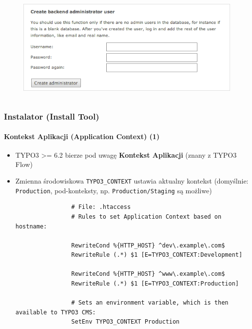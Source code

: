 \begin{frame}[fragile]
\begin{columns}[T]
\begin{column}{.7\textwidth}
			\begin{figure}\vspace*{-0.4cm}
				\includegraphics[width=0.9\linewidth]{Images/InstallTool/SaltedPasswords.png}
			\end{figure}
		\end{column}
	\end{columns}

\end{frame}


\begin{frame}[fragile]
	\frametitle{Instalator (Install Tool)}
	\framesubtitle{Kontekst Aplikacji (Application Context) (1)}

	\begin{itemize}
		\item TYPO3 >= 6.2 bierze pod uwagę \textbf{Kontekst Aplikacji}\newline
			\smaller(znany z TYPO3 Flow)\normalsize
		\item Zmienna środowiskowa \texttt{TYPO3\_CONTEXT} ustawia aktualny kontekst\newline
			\smaller(domyślnie: \texttt{Production}, pod-konteksty, np. \texttt{Production/Staging} są możliwe)\normalsize

			\begin{lstlisting}
				# File: .htaccess
				# Rules to set Application Context based on hostname:

				RewriteCond %{HTTP_HOST} ^dev\.example\.com$
				RewriteRule (.*) $1 [E=TYPO3_CONTEXT:Development]

				RewriteCond %{HTTP_HOST} ^www\.example\.com$
				RewriteRule (.*) $1 [E=TYPO3_CONTEXT:Production]

				# Sets an environment variable, which is then available to TYPO3 CMS:
				SetEnv TYPO3_CONTEXT Production
			\end{lstlisting}

	\end{itemize}

\end{frame}

